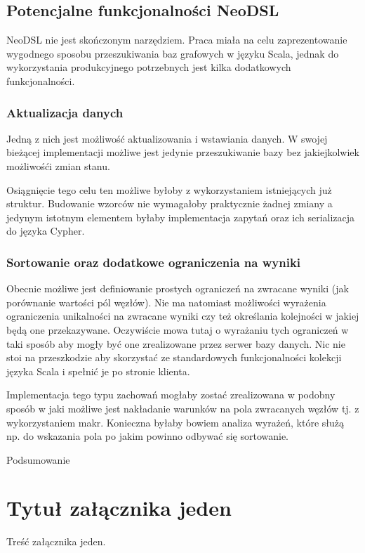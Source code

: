 \documentclass[brudnopis]{xmgr}
\begin{document}
\section{Potencjalne funkcjonalności NeoDSL}

NeoDSL nie jest skończonym narzędziem. Praca miała na celu zaprezentowanie wygodnego sposobu przeszukiwania baz grafowych w języku Scala, jednak do wykorzystania produkcyjnego potrzebnych jest kilka dodatkowych funkcjonalności.

\subsection{Aktualizacja danych}

Jedną z nich jest możliwość aktualizowania i wstawiania danych. W swojej bieżącej implementacji możliwe jest jedynie przeszukiwanie bazy bez jakiejkolwiek możliwośći zmian stanu. 

Osiągnięcie tego celu ten możliwe byłoby z wykorzystaniem istniejących już struktur. Budowanie wzorców nie wymagałoby praktycznie żadnej zmiany a jedynym istotnym elementem byłaby implementacja zapytań oraz ich serializacja do języka Cypher.

\subsection{Sortowanie oraz dodatkowe ograniczenia na wyniki}

Obecnie możliwe jest definiowanie prostych ograniczeń na zwracane wyniki (jak porównanie wartości pól węzłów). Nie ma natomiast możliwości wyrażenia ograniczenia unikalności na zwracane wyniki czy też określania kolejności w jakiej będą one przekazywane. Oczywiście mowa tutaj o wyrażaniu tych ograniczeń w taki sposób aby mogły być one zrealizowane przez serwer bazy danych. Nic nie stoi na przeszkodzie aby skorzystać ze standardowych funkcjonalności kolekcji języka Scala i spełnić je po stronie klienta.

Implementacja tego typu zachowań mogłaby zostać zrealizowana w podobny sposób w jaki możliwe jest nakładanie warunków na pola zwracanych węzłów tj. z wykorzystaniem makr. Konieczna byłaby bowiem analiza wyrażeń, które służą np. do wskazania pola po jakim powinno odbywać się sortowanie.

\summary
Podsumowanie

\appendix
\chapter{Tytuł załącznika jeden}

Treść załącznika jeden.

\nocite{*}



\listoftables

\listoffigures

\oswiadczenie
\end{document}

